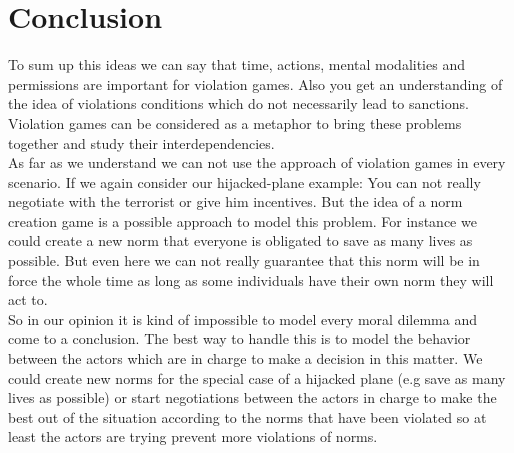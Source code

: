 \documentclass[conference]{IEEE}
\begin{document}
\section{Conclusion}
To sum up this ideas we can say that time, actions, mental modalities and permissions are important for violation games. Also you get an understanding of the idea of violations conditions which do not necessarily lead to sanctions. Violation games can be considered as a metaphor to bring these problems together and study their interdependencies. \\
As far as we understand we can not use the approach of violation games in every scenario. If we again consider our hijacked-plane example: You can not really negotiate with the terrorist or give him incentives. But the idea of a norm creation game is a possible approach to model this problem. For instance we could create a new norm that everyone is obligated to save as many lives as possible. But even here we can not really guarantee that this norm will be in force the whole time as long as some individuals have their own norm they will act to.\\
So in our opinion it is kind of impossible to model every moral dilemma and come to a conclusion. The best way to handle this is to model the behavior between the actors which are in charge to make a decision in this matter. We could create new norms for the special case of a hijacked plane (e.g save as many lives as possible) or start negotiations between the actors in charge to make the best out of the situation according to the norms that have been violated so at least the actors are trying prevent more violations of norms.\\
\end{document}
